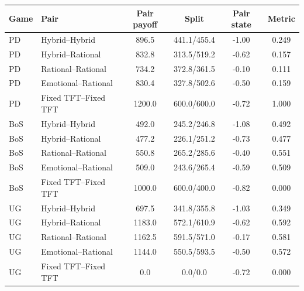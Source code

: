 \begin{tabular}{llcccc}
\toprule
Game & Pair & Pair payoff & Split & Pair state & Metric \\ 
\midrule
PD & Hybrid--Hybrid & 896.5 & 441.1/455.4 & -1.00 & 0.249 \\ 
PD & Hybrid--Rational & 832.8 & 313.5/519.2 & -0.62 & 0.157 \\ 
PD & Rational--Rational & 734.2 & 372.8/361.5 & -0.10 & 0.111 \\ 
PD & Emotional--Rational & 830.4 & 327.8/502.6 & -0.50 & 0.159 \\ 
PD & Fixed TFT--Fixed TFT & 1200.0 & 600.0/600.0 & -0.72 & 1.000 \\ 
\midrule
BoS & Hybrid--Hybrid & 492.0 & 245.2/246.8 & -1.08 & 0.492 \\ 
BoS & Hybrid--Rational & 477.2 & 226.1/251.2 & -0.73 & 0.477 \\ 
BoS & Rational--Rational & 550.8 & 265.2/285.6 & -0.40 & 0.551 \\ 
BoS & Emotional--Rational & 509.0 & 243.6/265.4 & -0.59 & 0.509 \\ 
BoS & Fixed TFT--Fixed TFT & 1000.0 & 600.0/400.0 & -0.82 & 0.000 \\ 
\midrule
UG & Hybrid--Hybrid & 697.5 & 341.8/355.8 & -1.03 & 0.349 \\ 
UG & Hybrid--Rational & 1183.0 & 572.1/610.9 & -0.62 & 0.592 \\ 
UG & Rational--Rational & 1162.5 & 591.5/571.0 & -0.17 & 0.581 \\ 
UG & Emotional--Rational & 1144.0 & 550.5/593.5 & -0.50 & 0.572 \\ 
UG & Fixed TFT--Fixed TFT & 0.0 & 0.0/0.0 & -0.72 & 0.000 \\ 
\bottomrule
\end{tabular}
